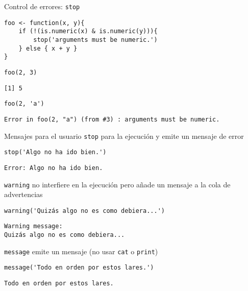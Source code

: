 \documentclass[xcolor={usenames,svgnames,dvipsnames}]{beamer}
\begin{document}
\begin{frame}[fragile,label={sec:orgheadline11}]{Control de errores: \texttt{stop}}
 \lstset{language=R,label= ,caption= ,captionpos=b,numbers=none}
\begin{lstlisting}
foo <- function(x, y){
    if (!(is.numeric(x) & is.numeric(y))){
        stop('arguments must be numeric.')
    } else { x + y }
}
\end{lstlisting}

\lstset{language=R,label= ,caption= ,captionpos=b,numbers=none}
\begin{lstlisting}
foo(2, 3)
\end{lstlisting}

\begin{verbatim}
[1] 5
\end{verbatim}

\lstset{language=R,label= ,caption= ,captionpos=b,numbers=none}
\begin{lstlisting}
foo(2, 'a')
\end{lstlisting}

\begin{verbatim}
Error in foo(2, "a") (from #3) : arguments must be numeric.
\end{verbatim}
\end{frame}

\begin{frame}[fragile,label={sec:orgheadline12}]{Mensajes para el usuario}
 \texttt{stop} para la ejecución y emite un mensaje de error
\lstset{language=R,label= ,caption= ,captionpos=b,numbers=none}
\begin{lstlisting}
stop('Algo no ha ido bien.')
\end{lstlisting}

\begin{verbatim}
Error: Algo no ha ido bien.
\end{verbatim}

\texttt{warning} no interfiere en la ejecución pero añade un mensaje a la cola de advertencias
\lstset{language=R,label= ,caption= ,captionpos=b,numbers=none}
\begin{lstlisting}
warning('Quizás algo no es como debiera...')
\end{lstlisting}

\begin{verbatim}
Warning message:
Quizás algo no es como debiera...
\end{verbatim}

\texttt{message} emite un mensaje (\alert{no usar \texttt{cat} o \texttt{print}})
\lstset{language=R,label= ,caption= ,captionpos=b,numbers=none}
\begin{lstlisting}
message('Todo en orden por estos lares.')
\end{lstlisting}

\begin{verbatim}
Todo en orden por estos lares.
\end{verbatim}
\end{frame}
\end{document}
